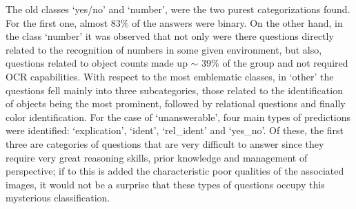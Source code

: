 The old classes `yes/no' and `number', were the two purest categorizations found. For the first one, almost 83\% of the answers were binary. On the other hand, in the class `number' it was observed that not only were there questions directly related to the recognition of numbers in some given environment, but also, questions related to object counts made up $\sim$ 39\% of the group and not required OCR capabilities.
With respect to the most emblematic classes, in `other' the questions fell mainly into three subcategories, those related to the identification of objects being the most prominent, followed by relational questions and finally color identification. For the case of `unanswerable', four main types of predictions were identified: `explication', `ident', `rel\_ident' and `yes\_no'. Of these, the first three are categories of questions that are very difficult to answer since they require very great reasoning skills, prior knowledge and management of perspective; if to this is added the characteristic poor qualities of the associated images, it would not be a surprise that these types of questions occupy this mysterious classification.


